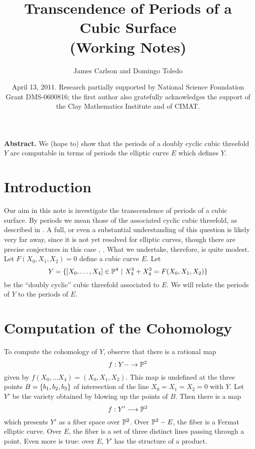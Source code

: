 \documentclass[11pt]{amsart}
\title{Transcendence of Periods of a Cubic Surface \\ (Working Notes)}
\author{James Carlson and Domingo Toledo }
\date{April 13, 2011. Research partially supported by National Science 
Foundation Grant DMS-0600816;
 the first author also gratefully acknowledges the support of the Clay
 Mathematics Institute and of CIMAT.  \\ 
 }
\newcommand{\dashedarrow}{-\to}
\begin{document}
\maketitle

{\bf Abstract.} We (hope to) show that the periods of a doubly cyclic
cubic threefold $Y$ are computable in terms of periods the elliptic curve
$E$ which defines $Y$.


\parskip=1pt
\tableofcontents


\parskip=5pt

\section{Introduction}

Our aim in this note is investigate the transcendence of periods
of a cubic surface.  By periods we mean those of the associated
cyclic cubic threefold, as described in \cite{ACT}. A full, or
even a substantial understanding of this question is likely very
far away, since it is not yet resolved for elliptic curves, 
though there are precise conjectures in this case \cite{Andre}, 
\cite{Waldschmitt}.  What we undertake, therefore, is quite modest.
Let $F(X_0,X_1,X_2) = 0$ define a cubic curve $E$.  Let
\[
   Y = \{[X_0, \ldots, X_4] \in {\mathbb P}^4\ |\ X_3^3 + X_4^3 = F(X_0,X_1,X_2)\}
\]
be the ``doubly cyclic'' cubic threefold associated to $E$.  We will relate
the periods of $Y$ to the periods of $E$. 

\section{Computation of the Cohomology}

To compute the cohomology of $Y$, observe that there is a rational map
\[
   f: Y \dashedarrow \PP^2
\]
given by $f(X_0, \ldots X_4) = (X_0, X_1 , X_2)$. This map is undefined
at the three points $B = \{b_1, b_2, b_3\}$ of intersection of the line 
$X_0 = X_1 = X_2 = 0$ with  $Y$.  Let $Y'$ be the variety 
obtained by blowing up the points of $B$. Then there is a map
\[
   f: Y' \longrightarrow {\mathbb P}^2
\]
which presents $Y'$ as a fiber space over ${\mathbb P}^2$.  Over ${\mathbb P}^2 - E$, the
fiber is a Fermat elliptic curve.  Over $E$, the fiber is a set of three 
distinct lines passing through a point.  Even more is true: over $E$,
$Y'$ has the structure of a product.
\end{document}
